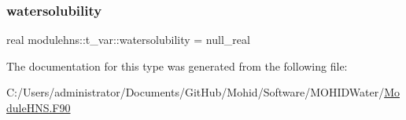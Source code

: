 \mbox{\label{structmodulehns_1_1t__var_a46ed490881cba886fb064f7899830821}} 
\subsubsection{\texorpdfstring{watersolubility}{watersolubility}}
{\footnotesize\ttfamily real modulehns\+::t\+\_\+var\+::watersolubility = null\+\_\+real\hspace{0.3cm}{\ttfamily [private]}}



The documentation for this type was generated from the following file\+:\begin{DoxyCompactItemize}
\item 
C\+:/\+Users/administrator/\+Documents/\+Git\+Hub/\+Mohid/\+Software/\+M\+O\+H\+I\+D\+Water/\mbox{\hyperlink{_module_h_n_s_8_f90}{Module\+H\+N\+S.\+F90}}\end{DoxyCompactItemize}

